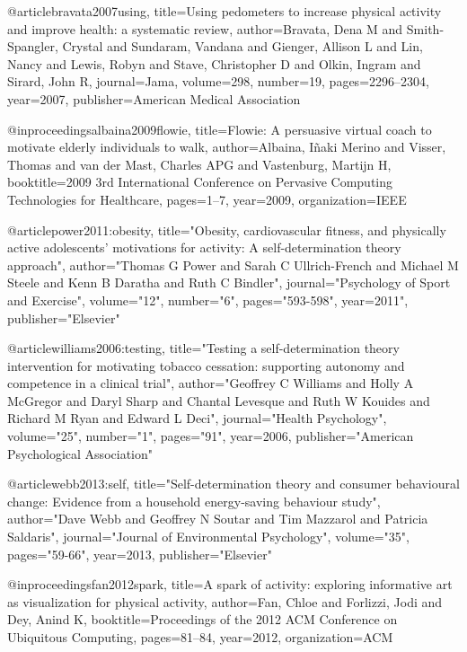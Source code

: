 @article{bravata2007using,
  title={Using pedometers to increase physical activity and improve health: a systematic review},
  author={Bravata, Dena M and Smith-Spangler, Crystal and Sundaram, Vandana and Gienger, Allison L and Lin, Nancy and Lewis, Robyn and Stave, Christopher D and Olkin, Ingram and Sirard, John R},
  journal={Jama},
  volume={298},
  number={19},
  pages={2296--2304},
  year={2007},
  publisher={American Medical Association}
}

@inproceedings{albaina2009flowie,
  title={Flowie: A persuasive virtual coach to motivate elderly individuals to walk},
  author={Albaina, I{\~n}aki Merino and Visser, Thomas and van der Mast, Charles APG and Vastenburg, Martijn H},
  booktitle={2009 3rd International Conference on Pervasive Computing Technologies for Healthcare},
  pages={1--7},
  year={2009},
  organization={IEEE}
}


@article{power2011:obesity,
  title="Obesity, cardiovascular fitness, and physically active adolescents' motivations for activity: A self-determination theory approach",
  author="Thomas G Power and Sarah C Ullrich-French and Michael M Steele and Kenn B Daratha and Ruth C Bindler",
  journal="Psychology of Sport and Exercise",
  volume="12",
  number="6",
  pages="593-598",
  year={2011}",
  publisher="Elsevier"
}

@article{williams2006:testing,
  title="Testing a self-determination theory intervention for motivating tobacco cessation: supporting autonomy and competence in a clinical trial",
  author="Geoffrey C Williams and Holly A McGregor and Daryl Sharp and Chantal Levesque and Ruth W Kouides and Richard M Ryan and Edward L Deci",
  journal="Health Psychology",
  volume="25",
  number="1",
  pages="91",
  year={2006},
  publisher="American Psychological Association"
}

@article{webb2013:self,
  title="Self-determination theory and consumer behavioural change: Evidence from a household energy-saving behaviour study",
  author="Dave Webb and Geoffrey N Soutar and Tim Mazzarol and Patricia Saldaris",
  journal="Journal of Environmental Psychology",
  volume="35",
  pages="59-66",
  year={2013},
  publisher="Elsevier"
}

@inproceedings{fan2012spark,
  title={A spark of activity: exploring informative art as visualization for physical activity},
  author={Fan, Chloe and Forlizzi, Jodi and Dey, Anind K},
  booktitle={Proceedings of the 2012 ACM Conference on Ubiquitous Computing},
  pages={81--84},
  year={2012},
  organization={ACM}
}

